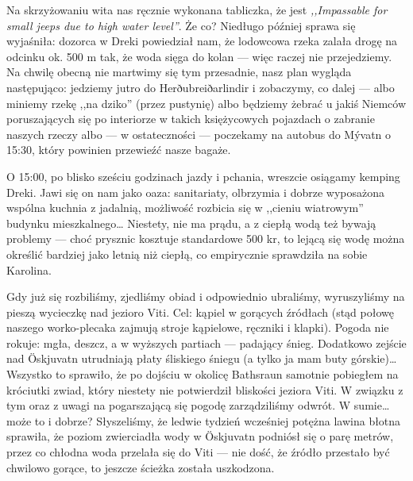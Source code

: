 
Na skrzyżowaniu wita nas ręcznie wykonana tabliczka, że  jest \emph{,,Impassable for small jeeps due to high water level''}. Że co? Niedługo później sprawa się wyjaśniła: dozorca w Dreki powiedział nam, że lodowcowa rzeka zalała drogę na odcinku ok. 500 m tak, że woda sięga do kolan --- więc raczej nie przejedziemy. Na chwilę obecną nie martwimy się tym przesadnie, nasz plan wygląda następująco: jedziemy jutro do Herðubreiðarlindir i zobaczymy, co dalej --- albo miniemy rzekę ,,na dziko'' (przez pustynię) albo będziemy żebrać u jakiś Niemców poruszających się po interiorze w takich księżycowych pojazdach o zabranie naszych rzeczy albo --- w ostateczności --- poczekamy na autobus do Mývatn o 15:30, który powinien przewieźć nasze bagaże.

O 15:00, po blisko sześciu godzinach jazdy i pchania, wreszcie osiągamy kemping Dreki. Jawi się on nam jako oaza: sanitariaty, olbrzymia i dobrze wyposażona wspólna kuchnia z jadalnią, możliwość rozbicia się w ,,cieniu wiatrowym'' budynku mieszkalnego… Niestety, nie ma prądu, a z ciepłą wodą też bywają problemy --- choć prysznic kosztuje standardowe 500 kr, to lejącą się wodę można określić bardziej jako letnią niż ciepłą, co empirycznie sprawdziła na sobie Karolina.

Gdy już się rozbiliśmy, zjedliśmy obiad i odpowiednio ubraliśmy, wyruszyliśmy na pieszą wycieczkę nad jezioro Viti. Cel: kąpiel w gorących źródłach (stąd połowę naszego worko-plecaka zajmują stroje kąpielowe, ręczniki i klapki). Pogoda nie rokuje: mgła, deszcz, a w wyższych partiach --- padający śnieg. Dodatkowo zejście nad Öskjuvatn utrudniają płaty śliskiego śniegu (a tylko ja mam buty górskie)… Wszystko to sprawiło, że po dojściu w okolicę Bathsraun samotnie pobiegłem na króciutki zwiad, który niestety nie potwierdził bliskości jeziora Viti. W związku z tym oraz z uwagi na pogarszającą się pogodę zarządziliśmy odwrót. W sumie… może to i dobrze? Słyszeliśmy, że ledwie tydzień wcześniej potężna lawina błotna sprawiła, że poziom zwierciadła wody w Öskjuvatn podniósł się o parę metrów, przez co chłodna woda przelała się do Viti --- nie dość, że źródło przestało być chwilowo gorące, to jeszcze ścieżka została uszkodzona.


